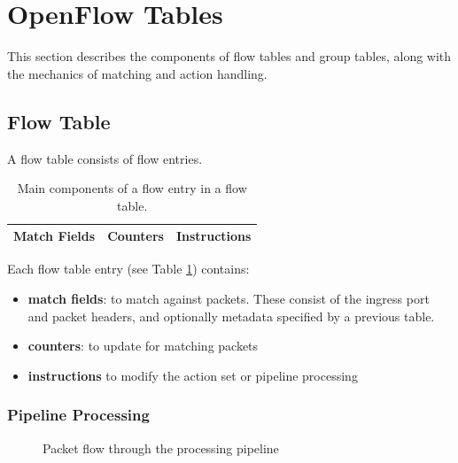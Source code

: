 \documentclass[10pt]{article}
\begin{document}
\section{OpenFlow Tables}
This section describes the components of flow tables and group tables, along with the mechanics of matching and action handling.

\subsection{Flow Table}
\label{ft:flowtableentry}

A flow table consists of flow entries.

\begin{table}[hbp]
\centering
\begin{tabular}{|c|c|c|}
\hline	
Match Fields & Counters & Instructions\\ 
\hline	
\end{tabular}
\caption{Main components of a flow entry in a flow table.}
\label{table:flow entry}
\end{table}

Each flow table entry (see Table \ref{table:flow entry}) contains: 
\begin{itemize} 
\item \textbf{match fields}: to match against packets. These consist of the ingress port and packet headers, and optionally metadata specified by a previous table.
\item \textbf{counters}: to update for matching packets
\item \textbf{instructions} to modify the action set or pipeline processing
\end{itemize} 

\subsubsection{Pipeline Processing}
\label{sec:pipeline}

\begin{figure}[htbp]
\centering
{}
\caption{Packet flow through the processing pipeline}
\label{fig:packet flow multiple tables}
\end{figure}
\end{document}
